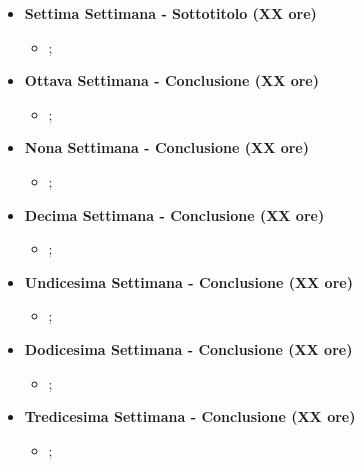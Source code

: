 {\begin{itemize}
        \item \textbf{Settima Settimana - Sottotitolo (XX ore)} 
        \begin{itemize}
            \item ;
        \end{itemize}

        \item \textbf{Ottava Settimana - Conclusione (XX ore)} 
        \begin{itemize}
            \item ;
        \end{itemize}

        \item \textbf{Nona Settimana - Conclusione (XX ore)} 
        \begin{itemize}
            \item ;
        \end{itemize}

        \item \textbf{Decima Settimana - Conclusione (XX ore)} 
        \begin{itemize}
            \item ;
        \end{itemize}

        \item \textbf{Undicesima Settimana - Conclusione (XX ore)} 
        \begin{itemize}
            \item ;
        \end{itemize}

        \item \textbf{Dodicesima Settimana - Conclusione (XX ore)} 
        \begin{itemize}
            \item ;
        \end{itemize}

        \item \textbf{Tredicesima Settimana - Conclusione (XX ore)} 
        \begin{itemize}
            \item ;
        \end{itemize}
    \end{itemize}
}

\newcommand{\totaleOre}{}

\newcommand{\obiettiviObbligatori}{
	 \item \underline{\textit{O01}}: primo obiettivo;
	 \item \underline{\textit{O02}}: secondo obiettivo;
	 \item \underline{\textit{O03}}: terzo obiettivo;
	 
}

